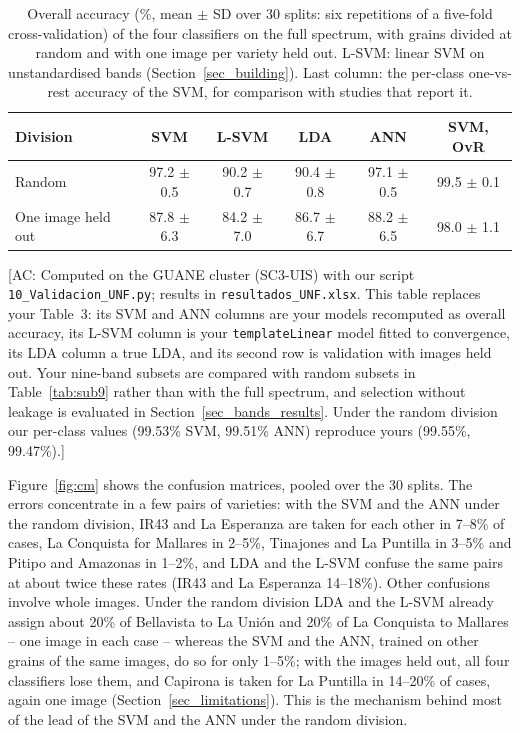 \documentclass[final,5p,times,twocolumn]{elsarticle}
\newcommand{\added}[1]{{\color{blue}#1}}
\newcommand{\acnote}[1]{{\color{red}\small\textsf{[AC: #1]}}}
\begin{document}
\begin{table}[htbp!]
    \centering
    \caption{\added{Overall accuracy (\%, mean $\pm$ SD over 30 splits: six repetitions of a five-fold cross-validation) of the four classifiers on the full spectrum, with grains divided at random and with one image per variety held out. L-SVM: linear SVM on unstandardised bands (Section~\ref{sec_building}). Last column: the per-class one-vs-rest accuracy of the SVM, for comparison with studies that report it.}}
    \label{tab:acc}
    \begin{tabular}{lccccc}
    \hline
    Division & SVM & L-SVM & LDA & ANN & SVM, OvR \\
    \hline
    Random             & 97.2 $\pm$ 0.5 & 90.2 $\pm$ 0.7 & 90.4 $\pm$ 0.8 & 97.1 $\pm$ 0.5 & 99.5 $\pm$ 0.1 \\
    One image held out & 87.8 $\pm$ 6.3 & 84.2 $\pm$ 7.0 & 86.7 $\pm$ 6.7 & 88.2 $\pm$ 6.5 & 98.0 $\pm$ 1.1 \\
    \hline
    \end{tabular}
\end{table}
\acnote{Computed on the GUANE cluster (SC3-UIS) with our script \texttt{10\_Validacion\_UNF.py}; results in \texttt{resultados\_UNF.xlsx}. This table replaces your Table~3: its SVM and ANN columns are your models recomputed as overall accuracy, its L-SVM column is your \texttt{templateLinear} model fitted to convergence, its LDA column a true LDA, and its second row is validation with images held out. Your nine-band subsets are compared with random subsets in Table~\ref{tab:sub9} rather than with the full spectrum, and selection without leakage is evaluated in Section~\ref{sec_bands_results}. Under the random division our per-class values (99.53\% SVM, 99.51\% ANN) reproduce yours (99.55\%, 99.47\%).}

\added{Figure~\ref{fig:cm} shows the confusion matrices, pooled over the 30 splits. The errors concentrate in a few pairs of varieties: with the SVM and the ANN under the random division, IR43 and La Esperanza are taken for each other in 7--8\% of cases, La Conquista for Mallares in 2--5\%, Tinajones and La Puntilla in 3--5\% and Pitipo and Amazonas in 1--2\%, and LDA and the L-SVM confuse the same pairs at about twice these rates (IR43 and La Esperanza 14--18\%). Other confusions involve whole images. Under the random division LDA and the L-SVM already assign about 20\% of Bellavista to La Uni\'on and 20\% of La Conquista to Mallares -- one image in each case -- whereas the SVM and the ANN, trained on other grains of the same images, do so for only 1--5\%; with the images held out, all four classifiers lose them, and Capirona is taken for La Puntilla in 14--20\% of cases, again one image (Section~\ref{sec_limitations}). This is the mechanism behind most of the lead of the SVM and the ANN under the random division.}
\end{document}
